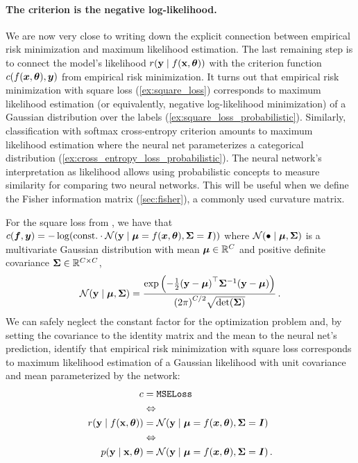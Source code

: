 \paragraph{The criterion is the negative log-likelihood.}
We are now very close to writing down the explicit connection between empirical risk minimization and maximum likelihood estimation.
The last remaining step is to connect the model's likelihood $r({\mathbf{y}} \mid f({\mathbf{x}}, {\bm{\theta}}))$ with the criterion function $c(f({\bm{x}}, {\bm{\theta}}), {\bm{y}})$ from empirical risk minimization.
It turns out that empirical risk minimization with square loss (\cref{ex:square_loss}) corresponds to maximum likelihood estimation (or equivalently, negative log-likelihood minimization) of a Gaussian distribution over the labels (\cref{ex:square_loss_probabilistic}).
Similarly, classification with softmax cross-entropy criterion amounts to maximum likelihood estimation where the neural net parameterizes a categorical distribution (\cref{ex:cross_entropy_loss_probabilistic}).
The neural network's interpretation as likelihood allows using probabilistic concepts to measure similarity for comparing two neural networks.
This will be useful when we define the Fisher information matrix (\cref{sec:fisher}), a commonly used curvature matrix.

\switchcolumn[1]
\begin{example}\label{ex:square_loss_probabilistic}
  For the square loss from , we have that $c({\bm{f}}, {\bm{y}}) = - \log( \mathrm{const.}
  \cdot {\mathcal{N}}({\mathbf{y}} \mid {\bm{\mu}} = f({\bm{x}}, {\bm{\theta}}), {\bm{\Sigma}} = {\bm{I}}))$ where ${\mathcal{N}}(\bullet \mid {\bm{\mu}}, {\bm{\Sigma}})$ is a multivariate Gaussian distribution with mean ${\bm{\mu}} \in {\mathbb{R}}^C$ and positive definite covariance ${\bm{\Sigma}} \in {\mathbb{R}}^{C \times C}$,
  \begin{align*}
    {\mathcal{N}}({\mathbf{y}} \mid {\bm{\mu}}, {\bm{\Sigma}})
    =
    \frac{
    \exp\left( -\frac{1}{2} {({\mathbf{y}} - {\bm{\mu}})}^\top {\bm{\Sigma}}^{-1} ({\mathbf{y}} - {\bm{\mu}}) \right)
    }{{(2\pi)}^{C/2} \sqrt{\det({\bm{\Sigma}})}}\,.
  \end{align*}
  We can safely neglect the constant factor for the optimization problem and, by setting the covariance to the identity matrix and the mean to the neural net's prediction, identify that empirical risk minimization with square loss corresponds to maximum likelihood estimation of a Gaussian likelihood with unit covariance and mean parameterized by the network:
  \begin{align*}
    c                             & = \text{\texttt{MSELoss}}
    \\
                                  & \Leftrightarrow
    \\
    r({\mathbf{y}} \mid f({\mathbf{x}}, {\bm{\theta}})) & = {\mathcal{N}}({\mathbf{y}} \mid {\bm{\mu}} = f({\bm{x}}, {\bm{\theta}}), {\bm{\Sigma}} = {\bm{I}})\,
    \\
                                  & \Leftrightarrow
    \\
    p({\mathbf{y}} \mid {\mathbf{x}}, {\bm{\theta}})    & = {\mathcal{N}}({\mathbf{y}} \mid {\bm{\mu}} = f({\bm{x}}, {\bm{\theta}}), {\bm{\Sigma}} = {\bm{I}})\,.
  \end{align*}
\end{example}

